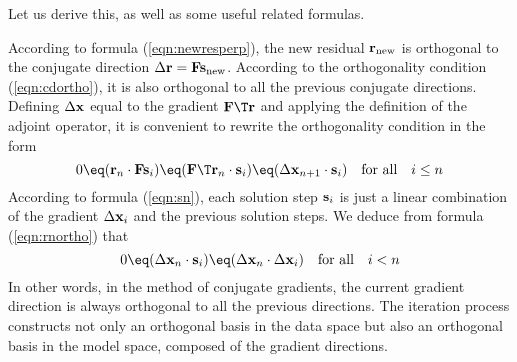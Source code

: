 \par
Let us derive this, as well as some useful related formulas.
\par
According to formula (\ref{eqn:newresperp}), the new residual $\bold
r_{\rm new}$ is orthogonal to the conjugate direction $\Delta \bold r
= \bold F \bold s_{\rm new}$. According to the orthogonality condition
(\ref{eqn:cdortho}), it is also orthogonal to all the previous
conjugate directions. Defining $\Delta \bold x$ equal to the gradient
$\bold F\T \bold r$ and applying the definition of the adjoint
operator, it is convenient to rewrite the orthogonality condition in
the form
  \begin{equation}
    \label{eqn:rnortho}
    0 \eq (\bold r_n \cdot \bold F \bold s_i) \eq 
    (\bold F\T \bold r_n \cdot \bold s_i) \eq
    (\Delta \bold x_{n+1} \cdot \bold s_i) 
    \quad \mbox{for all} \quad i \leq n
  \end{equation}
  According to formula (\ref{eqn:sn}), each solution step $\bold s_i$
  is just a linear combination of the gradient $\Delta \bold x_i$ and
  the previous solution steps. We deduce from formula
  (\ref{eqn:rnortho}) that
  \begin{equation}
    \label{eqn:cgortho}
    0 \eq (\Delta \bold x_n \cdot \bold s_i) \eq 
    (\Delta \bold x_n \cdot \Delta \bold x_i)
    \quad \mbox{for all} \quad i < n
  \end{equation}
  In other words, in the method of conjugate gradients, the current
  gradient direction is always orthogonal to all the previous
  directions. The iteration process constructs not only an orthogonal
  basis in the data space but also an orthogonal basis in the model
  space, composed of the gradient directions.
  
